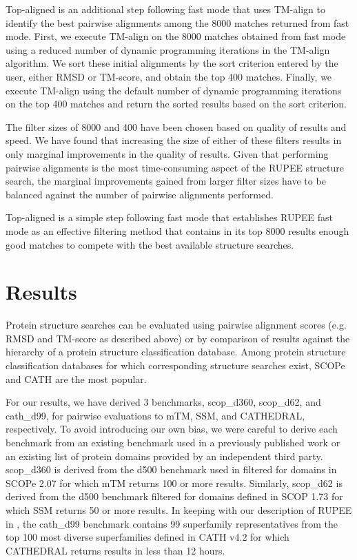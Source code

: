 \documentclass[10pt,letterpaper]{article}
\begin{document}
Top-aligned is an additional step following fast mode that uses TM-align to identify the best pairwise alignments among the 8000 matches returned from fast mode.
First, we execute TM-align on the 8000 matches obtained from fast mode using a reduced number of dynamic programming iterations in the TM-align algorithm. 
We sort these initial alignments by the sort criterion entered by the user, either RMSD or TM-score, and obtain the top 400 matches.
Finally, we execute TM-align using the default number of dynamic programming iterations on the top 400 matches and return the sorted results based on the sort criterion.

The filter sizes of 8000 and 400 have been chosen based on quality of results and speed. 
We have found that increasing the size of either of these filters results in only marginal improvements in the quality of results. 
Given that performing pairwise alignments is the most time-consuming aspect of the RUPEE structure search, the marginal improvements gained from larger filter sizes have to be balanced against the number of pairwise alignments performed. 

Top-aligned is a simple step following fast mode that establishes RUPEE fast mode as an effective filtering method that contains in its top 8000 results enough good matches to compete with the best available structure searches.

\section*{Results}

Protein structure searches can be evaluated using pairwise alignment scores (e.g. RMSD and TM-score as described above) or by comparison of results against the hierarchy of a protein structure classification database.
Among protein structure classification databases for which corresponding structure searches exist, SCOPe \cite{Fox2013} and CATH \cite{Orengo1997} are the most popular. 

For our results, we have derived 3 benchmarks, scop\_d360, scop\_d62, and cath\_d99, for pairwise evaluations to mTM, SSM, and CATHEDRAL, respectively.
To avoid introducing our own bias, we were careful to derive each benchmark from an existing benchmark used in a previously published work or an existing list of protein domains provided by an independent third party.  
scop\_d360 is derived from the d500 benchmark used in \cite{Dong2018} filtered for domains in SCOPe 2.07 for which mTM returns 100 or more results.
Similarly, scop\_d62 is derived from the d500 benchmark filtered for domains defined in SCOP 1.73 for which SSM returns 50 or more results.  
In keeping with our description of RUPEE in \cite{Ayoub2017}, the cath\_d99 benchmark contains 99 superfamily representatives from the top 100 most diverse superfamilies defined in CATH v4.2 for which CATHEDRAL returns results in less than 12 hours.
\end{document}
